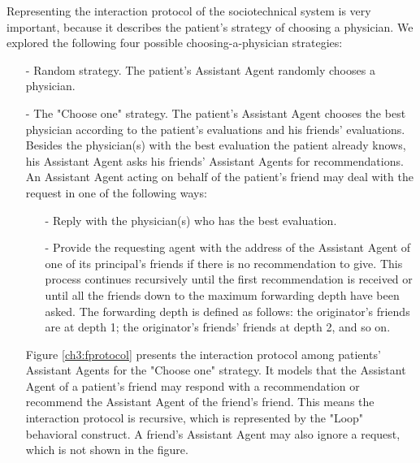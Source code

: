 Representing the interaction protocol of the sociotechnical system is very important, because it describes the patient's strategy of choosing a physician. We explored the following four possible choosing-a-physician strategies:
\begin{itemize}
\item[-]Random strategy. The patient's Assistant Agent randomly chooses a physician.
\item[-]The "Choose one" strategy. The patient's Assistant Agent chooses the best physician according to the patient's evaluations and his friends' evaluations. Besides the physician(s) with the best evaluation the patient already knows, his Assistant Agent asks his friends' Assistant Agents for recommendations. An Assistant Agent acting on behalf of the patient's friend may deal with the request in one of the following ways:

\begin{itemize}
\item[-]Reply with the physician(s) who has the best evaluation.
\item[-]Provide the requesting agent with the address of the Assistant Agent of one of its principal's friends if there is no recommendation to give. This process continues recursively until the first recommendation is received or until all the friends down to the maximum forwarding depth have been asked. The forwarding depth is defined as follows: the originator's friends are at depth 1; the originator's friends' friends at depth 2, and so on.
\end{itemize}

Figure \ref{ch3:fprotocol} presents the interaction protocol among patients' Assistant Agents for the "Choose one" strategy. It models that the Assistant Agent of a patient's friend may respond with a recommendation or recommend the Assistant Agent of the friend's friend. This means the interaction protocol is recursive, which is represented by the "Loop" behavioral construct. A friend's Assistant Agent may also ignore a request, which is not shown in the figure.
\end{itemize}

